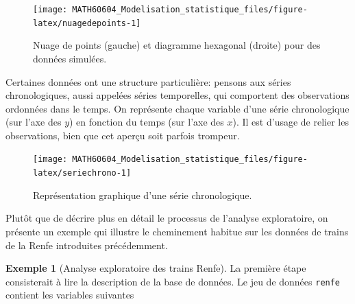 \documentclass[
  11pt,
  letterpaper,
]{article}
\theoremstyle{definition}
\theoremstyle{definition}
\newtheorem{example}{Exemple}[section]
\theoremstyle{definition}
\theoremstyle{remark}
\begin{document}
\begin{figure}

{\centering \texttt{[image: MATH60604\_Modelisation\_statistique\_files/figure-latex/nuagedepoints-1]} 

}

\caption{Nuage de points (gauche) et diagramme hexagonal (droite) pour des données simulées.}\label{fig:nuagedepoints}
\end{figure}

Certaines données ont une structure particulière: pensons aux séries chronologiques, aussi appelées séries temporelles, qui comportent des observations ordonnées dans le temps. On représente chaque variable d'une série chronologique (sur l'axe des \(y\)) en fonction du temps (sur l'axe des \(x\)). Il est d'usage de relier les observations, bien que cet aperçu soit parfois trompeur.

\begin{figure}

{\centering \texttt{[image: MATH60604\_Modelisation\_statistique\_files/figure-latex/seriechrono-1]} 

}

\caption{Représentation graphique d'une série chronologique.}\label{fig:seriechrono}
\end{figure}

Plutôt que de décrire plus en détail le processus de l'analyse exploratoire, on présente un exemple qui illustre le cheminement habitue sur les données de trains de la Renfe introduites précédemment.

\begin{example}[Analyse exploratoire des trains Renfe]
\protect\hypertarget{exm:renfe-aed}{}{\label{exm:renfe-aed} {} }La première étape consisterait à lire la description de la base de données. Le jeu de données \texttt{renfe} contient les variables suivantes
\end{example}
\end{document}

